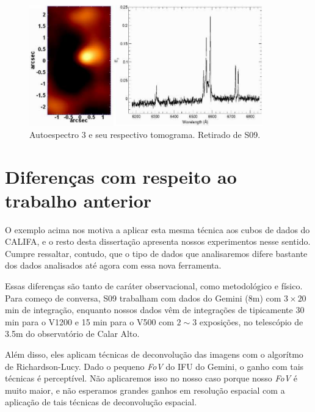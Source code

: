 \begin{figure}
    \includegraphics[width=0.9\textwidth]{figuras/figSteiner2009figA3.pdf}
    \caption[Tomograma e autoespectro 3 da galáxia NGC 4736.]
    {Autoespectro 3 e seu respectivo tomograma. Retirado de S09.}
    \label{fig:S09eigspec3}
\end{figure}



\section{Diferen\c{c}as com respeito ao trabalho anterior}

O exemplo acima nos motiva a aplicar esta mesma técnica aos cubos de dados do CALIFA, e o resto desta dissertação
apresenta nossos experimentos nesse sentido. Cumpre ressaltar, contudo, que o tipo de dados que analisaremos difere
bastante dos dados analisados até agora com essa nova ferramenta.

Essas diferenças são tanto de caráter observacional, como metodológico e físico. Para começo de conversa, S09 trabalham
com dados do Gemini (8m) com $3 \times 20$ min de integração, enquanto nossos dados vêm de integrações de tipicamente
30 min para o V1200 e 15 min para o V500 com $2\sim3$ exposições, no telescópio de 3.5m do observatório de Calar Alto.

Além disso, eles aplicam técnicas de deconvolução das imagens com o algorítmo de Richardson-Lucy. Dado o pequeno {\em
FoV} do IFU do Gemini, o ganho com tais técnicas é perceptível. Não aplicaremos isso no nosso caso porque nosso {\em
FoV} é muito maior, e não esperamos grandes ganhos em resolução espacial com a aplicação de tais técnicas de
deconvolução espacial.

